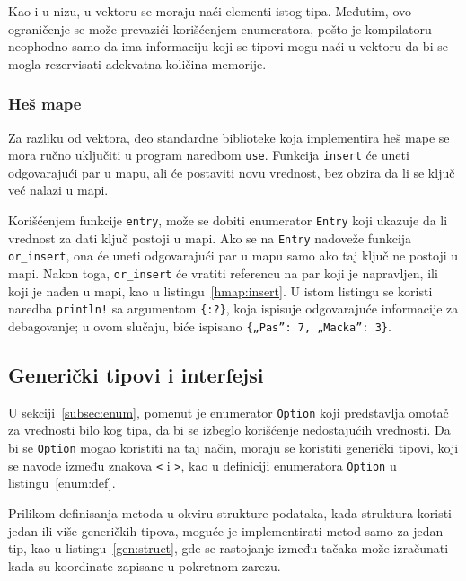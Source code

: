 \documentclass[12pt,oneside]{memoir}
\begin{document}


Kao i u nizu, u vektoru se moraju naći elementi istog tipa. Međutim, ovo
ograničenje se može prevazići korišćenjem enumeratora, pošto je kompilatoru
neophodno samo da ima informaciju koji se tipovi mogu naći u vektoru da bi se
mogla rezervisati adekvatna količina memorije.

\subsubsection{Heš mape}
Za razliku od vektora, deo standardne biblioteke koja implementira heš mape
se mora ručno uključiti u program naredbom \texttt{use}. Funkcija \texttt{insert} će uneti
odgovarajući par u mapu, ali će postaviti novu vrednost, bez obzira da li se ključ već
nalazi u mapi.

Korišćenjem funkcije \texttt{entry}, može se dobiti enumerator \texttt{Entry} koji ukazuje
da li vrednost za dati ključ postoji u mapi. Ako se na \texttt{Entry} nadoveže funkcija
\texttt{or\_insert}, ona će uneti odgovarajući par u mapu samo ako taj ključ ne postoji u
mapi. Nakon toga, \texttt{or\_insert} će vratiti referencu na par koji je napravljen, ili koji
je nađen u mapi, kao u listingu~\ref{hmap:insert}. U istom listingu se koristi naredba
\texttt{println!} sa argumentom \texttt{\{:?\}}, koja ispisuje odgovarajuće informacije
za debagovanje; u ovom slučaju, biće ispisano \texttt{\{„Pas”: 7, „Macka”: 3\}}.



\subsection{Generički tipovi i interfejsi}
U sekciji~\ref{subsec:enum}, pomenut je enumerator \texttt{Option} koji predstavlja
omotač za vrednosti bilo kog tipa, da bi se izbeglo korišćenje nedostajućih vrednosti.
Da bi se \texttt{Option} mogao koristiti na taj način, moraju se koristiti generički
tipovi, koji se navode između znakova \texttt{<} i \texttt{>}, kao u
definiciji enumeratora \texttt{Option} u listingu~\ref{enum:def}.

Prilikom definisanja metoda u okviru strukture podataka, kada struktura koristi
jedan ili više generičkih tipova, moguće je implementirati metod samo za jedan
tip, kao u listingu~\ref{gen:struct}, gde se rastojanje između tačaka može
izračunati kada su koordinate zapisane u pokretnom zarezu.
\end{document}
